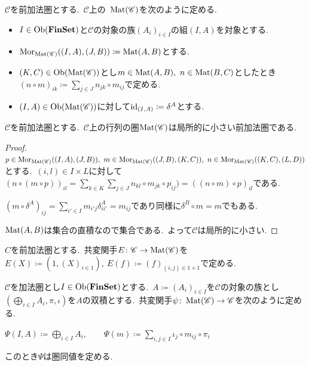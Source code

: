 \begin{definition} \label{def: MatrixCategory}
$\mathscr{C}$を前加法圏とする.\
$\mathscr{C}$上の\ $\operatorname{Mat}(\mathscr{C})$を次のように定める.
\begin{itemize}
	\item $I \in \operatorname{Ob}(\mathbf{FinSet})$と$\mathscr{C}$の対象の族$(A_i)_{i \in I}$の組$(I,A)$を対象とする.
	\item $\operatorname{Mor}_{\operatorname{Mat}(\mathscr{C})}((I,A), (J,B)) \coloneq \operatorname{Mat}(A,B)$とする.
	\item $(K,C) \in \operatorname{Ob}(\operatorname{Mat}(\mathscr{C}))$とし$m \in \operatorname{Mat}(A,B),\ n \in \operatorname{Mat}(B,C)$としたとき$(n \circ m)_{ik} \coloneq \sum_{j \in J} n_{jk} \circ m_{ij}$で定める.
	\item $(I,A) \in \operatorname{Ob}(\operatorname{Mat}(\mathscr{C}))$に対して$\operatorname{id}_{(I,A)} \coloneq \delta^A$とする.
\end{itemize}
\end{definition}

\begin{proposition} \label{prop: matrix_category_preadditive}
$\mathscr{C}$を前加法圏とする.\ $\mathscr{C}$上の行列の圏$\operatorname{Mat}(\mathscr{C})$は局所的に小さい前加法圏である.
\end{proposition}

\begin{proof}
$p \in \operatorname{Mor}_{\operatorname{Mat}(\mathscr{C})}((I,A), (J,B)),\ m \in \operatorname{Mor}_{\operatorname{Mat}(\mathscr{C})}((J,B), (K,C)),\ n \in \operatorname{Mor}_{\operatorname{Mat}(\mathscr{C})}((K,C), (L,D))$とする.\
$(i,l) \in I \times L$に対して$(n \circ (m \circ p))_{il} = \sum_{k \in K}\sum_{j \in J} n_{kl} \circ m_{jk} \circ p_{ij}) = ((n \circ m) \circ p)_{il}$である.\

$(m \circ \delta^A)_{ij} = \sum_{i' \in I} m_{i'j} \delta^A_{ii'} = m_{ij}$であり同様に$\delta^B \circ m = m$でもある.\

$\operatorname{Mat}(A, B)$は集合の直積なので集合である.\ よって$\mathscr{C}$は局所的に小さい.
\end{proof}

\begin{definition} \label{def: matrixEmbedding}
$C$を前加法圏とする.\
共変関手$E \colon \mathscr{C} \to \operatorname{Mat}(\mathscr{C})$を$E(X) \coloneq (1, (X)_{i \in 1}),\ E(f) \coloneq (f)_{(i,j) \in 1 \times 1}$で定める.
\end{definition}

\begin{proposition} \label{prop: matrix_category_equivalence}
$\mathscr{C}$を加法圏とし$I \in \operatorname{Ob}(\mathbf{FinSet})$とする.\
$A \coloneq (A_i)_{i \in I}$を$\mathscr{C}$の対象の族とし$(\bigoplus_{i \in I} A_i, \pi, \iota)$を$A$の双積とする.\ 共変関手$\psi \colon \operatorname{Mat}(\mathscr{C}) \to \mathscr{C}$を次のように定める.
\begin{center}
$\displaystyle \Psi(I,A) \coloneq \bigoplus_{i \in I}A_i,\qquad \Psi(m) \coloneq \sum_{i,j \in I} \iota_j \circ m_{ij} \circ \pi_i$
\end{center}
このとき$\Psi$は圏同値を定める.
\end{proposition}

